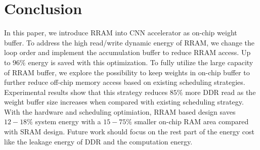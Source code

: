 \section{Conclusion}\label{sec:conclusion}

In this paper, we introduce RRAM into CNN accelerator as on-chip weight buffer. To address the high read/write dynamic energy of RRAM, we change the loop order and implement the accumulation buffer to reduce RRAM access. Up to $96\%$ energy is saved with this optimization. To fully utilize the large capacity of RRAM buffer, we explore the possibility to keep weights in on-chip buffer to further reduce off-chip memory access based on existing scheduling strategies. Experimental results show that this strategy reduces $85\%$ more DDR read as the weight buffer size increases when compared with existing scheduling strategy. With the hardware and scheduling optimiation, RRAM based design saves $12-18\%$ system energy with a $15-75\%$ smaller on-chip RAM area compared with SRAM design. Future work should focus on the rest part of the energy cost like the leakage energy of DDR and the computation energy.